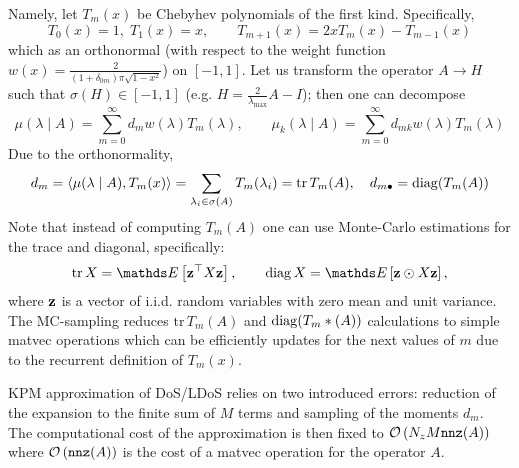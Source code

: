 Namely, let \( T_m(x)\) be Chebyhev polynomials of the first kind. Specifically,
\begin{equation}
      T_0(x) = 1, \; T_1(x) = x, \qquad T_{m+1}(x) = 2x T_m(x) - T_{m-1} (x)
\end{equation}
which as an orthonormal (with respect to the weight function \(w(x) = \frac{2}{(1+\delta_{0m}) \pi \sqrt{1-x^2}}\)) on \( [-1, 1 ]\). Let us transform the operator \( A \to H  \) such that \( \sigma(H) \in [-1, 1]\) (e.g. \( H = \frac{2}{\lambda_{\max{}}} A - I\)); then one can decompose 
\begin{equation}
      \mu( \lambda \mid A ) = \sum_{m=0}^\infty d_m w(\lambda)T_m(\lambda), \qquad       \mu_k( \lambda \mid A ) = \sum_{m=0}^\infty d_{mk} w(\lambda)T_m(\lambda) 
\end{equation}
Due to the orthonormality, 
\begin{equation}
      d_m = \left\langle \mu(\lambda \mid A ), T_m(x) \right\rangle = \sum_{\lambda_i \in \sigma(A)} T_m(\lambda_i) = \mathrm{tr} \, T_m(A), \quad d_{m\bullet} = \operatorname{diag}( T_m(A) )
\end{equation}
Note that instead of computing \( T_m(A) \) one can use Monte-Carlo estimations for the trace and diagonal, specifically:
\begin{equation}
      \mathrm{tr}\, X = \ds E \left[ \b z^\top X \b z \right], \qquad \mathrm{diag}\, X = \ds E \left[ \b z \odot X \b z \right], 
\end{equation}
where \( \mathbf{z} \) is a vector of i.i.d. random variables with zero mean and unit variance. The MC-sampling reduces \( \mathrm{tr}\, T_m(A) \) and \( \operatorname{diag} ( T_m*(A))\) calculations to simple matvec operations which can be efficiently updates for the next values of \( m \) due to the recurrent definition of \( T_m(x)\). 

KPM approximation of DoS/LDoS relies on two introduced errors: reduction of  the expansion to the finite sum of \( M \) terms and sampling of the moments \( d_m \). The computational cost of the approximation is then fixed to \( \mathcal{O} \left(  N_z M \texttt{nnz} (A) \right)\) where \( \mathcal{O} \left( \texttt{nnz} (A) \right)\) is the cost of a matvec operation for the operator \( A \).






